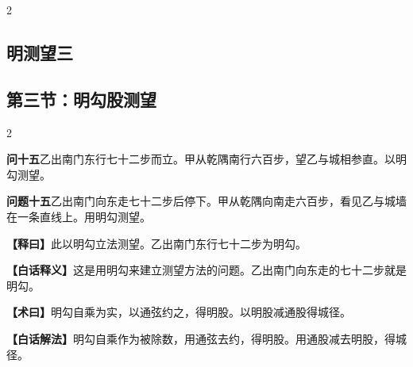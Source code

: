 \documentclass[11pt,a4paper]{article}
\newcommand{\WenQuestion}[1]{\textbf{\textcolor{classicalcolor}{#1}}}
\newcommand{\BaiQuestion}[1]{\textbf{\textcolor{moderncolor}{#1}}}
\newcommand{\WenExplain}{\textcolor{classicalcolor}{\textbf{【释曰】}}}
\newcommand{\BaiExplain}{\textcolor{moderncolor}{\textbf{【白话释义】}}}
\newcommand{\WenMethod}{\textcolor{classicalcolor}{\textbf{【术曰】}}}
\newcommand{\BaiMethod}{\textcolor{moderncolor}{\textbf{【白话解法】}}}
\begin{document}
\vspace{0.5em}

\begin{paracol}{2}
\subsection*{\textcolor{sectioncolor}{明测望三}}
\switchcolumn
\subsection*{\textcolor{sectioncolor}{第三节：明勾股测望}}
\end{paracol}

\vspace{0.5em}

\begin{paracol}{2}

\switchcolumn*
\begin{tcolorbox}[colback=red!3,colframe=red!30!black,boxrule=0.3pt]
\WenQuestion{问十五}\quad 乙出南门东行七十二步而立。甲从乾隅南行六百步，望乙与城相参直。以明勾测望。
\end{tcolorbox}
\switchcolumn
\begin{tcolorbox}[colback=blue!3,colframe=blue!30!black,boxrule=0.3pt]
\BaiQuestion{问题十五}\quad 乙出南门向东走七十二步后停下。甲从乾隅向南走六百步，看见乙与城墙在一条直线上。用明勾测望。
\end{tcolorbox}

\switchcolumn*
\begin{tcolorbox}[colback=red!5,colframe=red!30!black,boxrule=0.3pt]
\WenExplain\quad 此以明勾立法测望。乙出南门东行七十二步为明勾。
\end{tcolorbox}
\switchcolumn
\begin{tcolorbox}[colback=blue!5,colframe=blue!30!black,boxrule=0.3pt]
\BaiExplain\quad 这是用明勾来建立测望方法的问题。乙出南门向东走的七十二步就是明勾。
\end{tcolorbox}

\switchcolumn*
\begin{tcolorbox}[colback=red!5,colframe=red!40!black,boxrule=0.3pt]
\WenMethod\quad 明勾自乘为实，以通弦约之，得明股。以明股减通股得城径。
\end{tcolorbox}
\switchcolumn
\begin{tcolorbox}[colback=blue!5,colframe=blue!40!black,boxrule=0.3pt]
\BaiMethod\quad 明勾自乘作为被除数，用通弦去约，得明股。用通股减去明股，得城径。
\end{tcolorbox}


\end{paracol}
\end{document}
